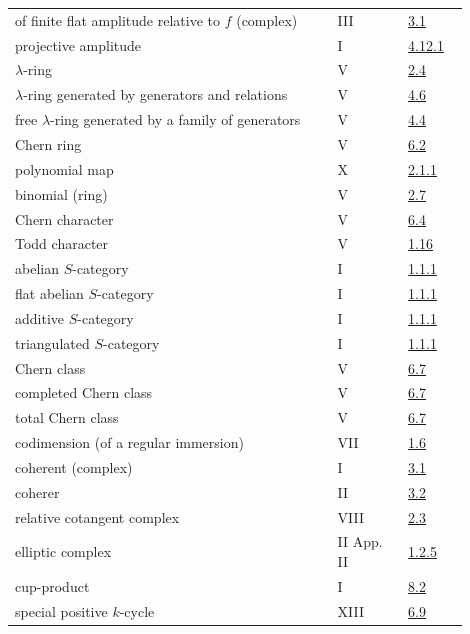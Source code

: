 \begin{longtable}{@{}>{\raggedright\arraybackslash}p{0.64\linewidth}>{\raggedright\arraybackslash}p{0.14\linewidth}>{\raggedright\arraybackslash}p{0.12\linewidth}@{}}
of finite flat amplitude relative to \(f\) (complex) & III & \hyperlink{sga6.e03.def.3-1}{3.1}\\
projective amplitude & I & \hyperlink{sga6.e01.rem.4-12-1}{4.12.1}\\
\(\lambda\)-ring & V & \hyperlink{sga6.e05.def.2-4}{2.4}\\
\(\lambda\)-ring generated by generators and relations & V & \hyperlink{sga6.e05.def.4-6}{4.6}\\
free \(\lambda\)-ring generated by a family of generators & V & \hyperlink{sga6.e05.def.4-4}{4.4}\\
Chern ring & V & \hyperlink{sga6.e05.def.6-2}{6.2}\\
polynomial map & X & \hyperlink{sga6.e10.def.2-1-1}{2.1.1}\\
binomial (ring) & V & \hyperlink{sga6.e05.def.2-7}{2.7}\\
Chern character & V & \hyperlink{sga6.e05.def.6-4}{6.4}\\
Todd character & V & \hyperlink{sga6.e05.para.1-16}{1.16}\\
abelian \(S\)-category & I & \hyperlink{sga6.e01.para.1-1-1}{1.1.1}\\
flat abelian \(S\)-category & I & \hyperlink{sga6.e01.para.1-1-1}{1.1.1}\\
additive \(S\)-category & I & \hyperlink{sga6.e01.para.1-1-1}{1.1.1}\\
triangulated \(S\)-category & I & \hyperlink{sga6.e01.para.1-1-1}{1.1.1}\\
Chern class & V & \hyperlink{sga6.e05.para.6-7}{6.7}\\
completed Chern class & V & \hyperlink{sga6.e05.para.6-7}{6.7}\\
total Chern class & V & \hyperlink{sga6.e05.para.6-7}{6.7}\\
codimension (of a regular immersion) & VII & \hyperlink{sga6.e07.def.1-6}{1.6}\\
coherent (complex) & I & \hyperlink{sga6.e01.def.3-1}{3.1}\\
coherer & II & \hyperlink{sga6.e02.sec.3.2}{3.2}\\
relative cotangent complex & VIII & \hyperlink{sga6.e08.def.2-3}{2.3}\\
elliptic complex & II App. II & \hyperlink{sga6.e02.para.1-2-5}{1.2.5}\\
cup-product & I & \hyperlink{sga6.e01.para.8-2}{8.2}\\
special positive \(k\)-cycle & XIII & \hyperlink{sga6.e13.def.6-9}{6.9}\\

\end{longtable}
